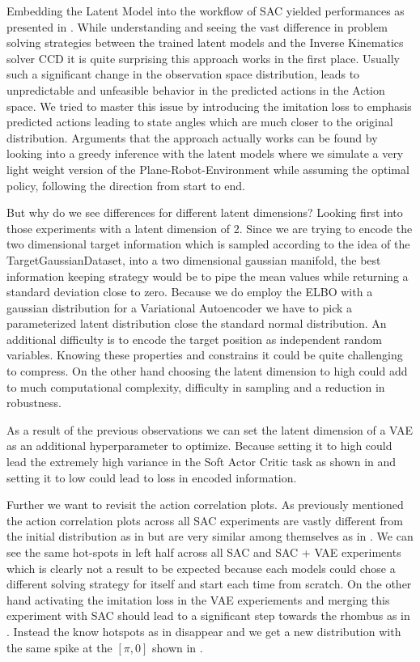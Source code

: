 Embedding the Latent Model into the workflow of SAC yielded performances as presented in . While understanding and seeing the vast difference in problem solving strategies between the trained latent models and the Inverse Kinematics solver CCD it is quite surprising this approach works in the first place. Usually such a significant change in the observation space distribution, leads to unpredictable and unfeasible behavior in the predicted actions in the Action space. We tried to master this issue by introducing the imitation loss to emphasis predicted actions leading to state angles which are much closer to the original distribution. Arguments that the approach actually works can be found by looking into a greedy inference with the latent models where we simulate a very light weight version of the Plane-Robot-Environment while assuming the optimal policy, following the direction from start to end.

But why do we see differences for different latent dimensions? Looking first into those experiments with a latent dimension of 2. Since we are trying to encode the two dimensional target information which is sampled according to the idea of the TargetGaussianDataset, into a two dimensional gaussian manifold, the best information keeping strategy would be to pipe the mean values while returning a standard deviation close to zero. Because we do employ the ELBO with a gaussian distribution for a Variational Autoencoder we have to pick a parameterized latent distribution close the standard normal distribution. An additional difficulty is to encode the target position as independent random variables. Knowing these properties and constrains it could be quite challenging to compress. On the other hand choosing the latent dimension to high could add to much computational complexity, difficulty in sampling and a reduction in robustness.

As a result of the previous observations we can set the latent dimension of a VAE as an additional hyperparameter to optimize. Because setting it to high could lead the extremely high variance in the Soft Actor Critic task as shown in  and setting it to low could lead to loss in encoded information. 

Further we want to revisit the action correlation plots. As previously mentioned the action correlation plots across all SAC experiments are vastly different from the initial distribution as in  but are very similar among themselves as in . We can see the same hot-spots in left half across all SAC and SAC + VAE experiments which is clearly not a result to be expected because each models could chose a different solving strategy for itself and start each time from scratch. On the other hand activating the imitation loss in  the VAE experiements and merging this experiment with SAC should lead to a significant step towards the rhombus as in . Instead the know hotspots as in  disappear and we get a new distribution with the same spike at the $[\pi, 0]$ shown in .

